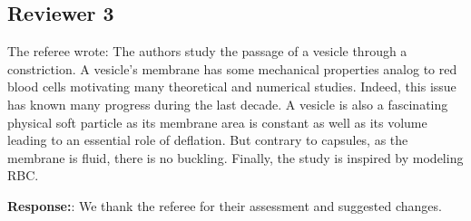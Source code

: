 \documentclass[11pt]{article}
\begin{document}
\newpage

\subsection*{Reviewer 3}

The referee wrote: The authors study the passage of a vesicle through a
constriction. A vesicle’s membrane has some mechanical properties analog
to red blood cells motivating many theoretical and numerical studies.
Indeed, this issue has known many progress during the last decade. A
vesicle is also a fascinating physical soft particle as its membrane
area is constant as well as its volume leading to an essential role of
deflation. But contrary to capsules, as the membrane is fluid, there is
no buckling. Finally, the study is inspired by modeling RBC. 

\noindent
{\bf Response:}: We thank the referee for their assessment and suggested
changes.
\end{document}

